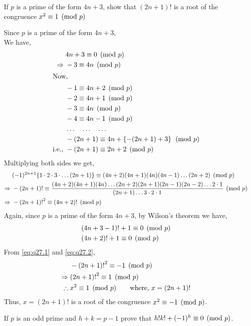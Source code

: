 \documentclass[12pt]{book}
\begin{document}
\begin{qn}
    If $ p  $ is a prime of the form $ 4n+3 $, show that $ (2n+1)! $ is a root of the congruence $ x^2\equiv 1 \pmod{p} $
\end{qn}
\begin{soln}
    Since $ p $ is a prime of the form $ 4n+3 $,\\
    We have,
    \begin{align*}
        & 4n+3\equiv 0 \pmod{p}\\
        \Rightarrow\; & -3\equiv 4n \pmod{p}\\
        \intertext{Now,}
        & -1\equiv 4n+2 \pmod{p}\\
        & -2\equiv 4n+1 \pmod{p}\\
        & -3\equiv 4n \pmod{p}\\
        & -4\equiv 4n-1 \pmod{p}\\
        & \dots\quad \dots\quad \dots\\
        & -(2n+1)\equiv 4n+\left\{ -(2n+1)+3 \right\} \pmod{p}\\
        \text{i.e., }& -(2n+1)\equiv 2n+2 \pmod{p}
    \end{align*}
    Multiplying both sides we get,
    \begin{align}
        & (-1)^{2n+1} \{1\cdot2\cdot3\cdot \dots (2n+1)\}\equiv (4n+2)(4n+1)(4n)(4n-1)\dots (2n+2) \pmod{p}\notag \\
        \Rightarrow\; & -(2n+1)! \equiv \frac{(4n+2)(4n+1)(4n)\dots (2n+2)(2n+1)(2n-1)(2n-2)\dots2\cdot1}{(2n+1)\dots3\cdot2\cdot1} \pmod{p}\notag \\
        \Rightarrow\; & -{(2n+1)!}^2 \equiv (4n+2)! \pmod{p}\label{eq:q27.1}
    \end{align}
    Again, since $ p $ is a prime of the form $ 4n+3 $, by Wilson's theorem we have,
    \begin{align}
        &(4n+3-1)!+1\equiv 0 \pmod{p}\notag\\
        &(4n+2)!+1\equiv 0 \pmod{p}\label{eq:q27.2}
    \end{align}
    From \eqref{eq:q27.1} and \eqref{eq:q27.2},
    \begin{align*}
        &-{(2n+1)!}^2\equiv -1 \pmod{p}\\
        \Rightarrow\; &{(2n+1)!}^2\equiv 1 \pmod{p}\\
        \therefore\; &x^2\equiv 1 \pmod{p}\qquad \text{where, } x=(2n+1)!
    \end{align*}
    Thus, $ x=(2n+1)! $ is a root of the congruence $ x^2\equiv -1 \pmod{p} $.
\end{soln}
\begin{qn}
    If $ p $ is an odd prime and $ h+k=p-1 $ prove that $ h! k! + (-1)^h\equiv 0 \pmod{p} $.
\end{qn}
\end{document}
